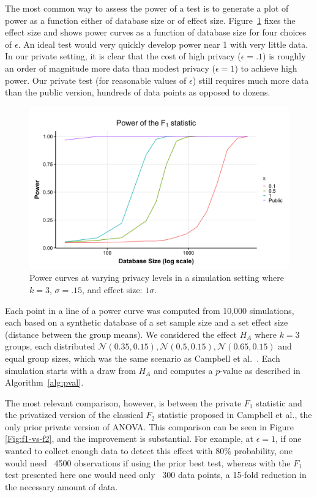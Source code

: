 \documentclass[USenglish,oneside]{article}
\newcounter{ag}
\newcounter{ab}
\newcounter{ar}
\newcounter{igh}
\renewcommand{\k}{\ensuremath{k}\xspace}
\newcommand{\normal}{\ensuremath{\mathcal{N}}}
\begin{document}
The most common way to assess the power of a test is to generate a plot of power as a function either of database size or of effect size. Figure~\ref{Fig:f1} fixes the effect size and shows power curves as a function of database size for four choices of $\epsilon$. An ideal test would very quickly develop power near 1 with very little data. In our private setting, it is clear that the cost of high privacy ($\epsilon = .1$) is roughly an order of magnitude more data than modest privacy ($\epsilon = 1$) to achieve high power. Our private test (for reasonable values of $\epsilon$) still requires much more data than the public version, hundreds of data points as opposed to dozens.

\begin{figure}
\centering
\includegraphics[width=.8\linewidth]{images/f1.png}
\caption{Power curves at varying privacy levels in a simulation setting where $k = 3$, $\sigma = .15$, and effect size: $1\sigma$.\label{Fig:f1}}
\end{figure}

Each point in a line of a power curve was computed from 10,000 simulations, each based on a synthetic database of a set sample size and a set effect size (distance between the group means).  We considered the effect $H_A$ where $\k=3$ groups, each distributed $\normal(0.35, 0.15),  \normal(0.5,0.15), \normal(0.65, 0.15)$ and equal group sizes, which was the same scenario as Campbell et al.~\cite{campbell2018diffprivanova}.
Each simulation starts with a draw from $H_A$ and computes a $p$-value as described in Algorithm~\ref{alg:pval}.

The most relevant comparison, however, is between the private $F_1$ statistic and the privatized version of the classical $F_2$ statistic proposed in Campbell et al., the only prior private version of ANOVA.  This comparison can be seen in Figure \ref{Fig:f1-vs-f2}, and the improvement is substantial.  For example, at $\epsilon = 1$, if one wanted to collect enough data to detect this effect with 80\% probability, one would need ~4500 observations if using the prior best test, whereas with the $F_1$ test presented here one would need only ~300 data points, a 15-fold reduction in the necessary amount of data.
\end{document}

